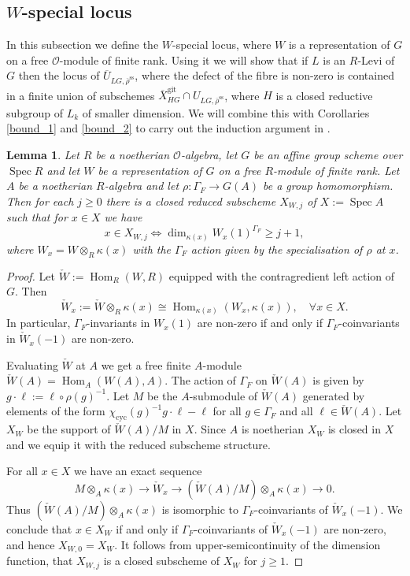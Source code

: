 \documentclass{amsart}
\newtheorem{lem}[prop]{Lemma}
\theoremstyle{definition}
\theoremstyle{remark}
\DeclareMathOperator{\Hom}{Hom}
\DeclareMathOperator{\Spec}{Spec}
\newcommand{\OO}{\mathcal O}
\newcommand{\rhobar}{\overline{\rho}}
\newcommand{\gps}{\mathrm{git}}
\newcommand{\Xbar}{\overline{X}}
\newcommand{\cyc}{\mathrm{cyc}}
\newcommand{\rhobarss}{\rhobar^{\mathrm{ss}}}
\newcommand{\Ubar}{\overline{U}}
\begin{document}
\subsection{\texorpdfstring{$W$-special locus}{W-special locus}}
In this subsection we define the $W$-special locus, where $W$ is a representation of $G$ on a 
free $\OO$-module of finite rank. Using it we will show that if $L$ is an $R$-Levi of $G$ 
then the locus of $\Ubar_{LG, \rhobarss}$, where the defect of the fibre is non-zero is contained in a finite 
union of subschemes $\Xbar^{\gps}_{HG}\cap U_{LG, \rhobarss}$, where $H$ is a closed reductive subgroup 
of $L_k$ of smaller dimension. We will combine this with Corollaries \ref{bound_1} and \ref{bound_2} 
to carry out the induction argument in .

\begin{lem}\label{V_iks} Let $R$ be a noetherian $\OO$-algebra, let $G$ be an affine group scheme 
over $\Spec R$ and let $W$ be a representation of $G$ on a free $R$-module of finite rank. 
Let $A$ be a noetherian $R$-algebra and let $\rho: \Gamma_F\rightarrow G(A)$ 
be a group homomorphism. Then for each $j\ge 0$ there is a closed reduced subscheme $X_{W, j}$ of $X:=\Spec A$ such that for 
$x\in X$ we have 
$$x\in X_{W,j}  \iff \dim_{\kappa(x)} W_x(1)^{\Gamma_F}\ge j+1,$$ where $W_x= W\otimes_{R} \kappa(x)$ with the 
$\Gamma_F$ action given by the specialisation of $\rho$ at $x$. 
\end{lem} 
\begin{proof} 
Let $\check{W}:= \Hom_R(W, R)$ equipped with the contragredient left action of  $G$. Then 
$$ \check{W}_x:= \check{W}\otimes_R \kappa(x)\cong \Hom_{\kappa(x)}(W_x, \kappa(x)), \quad \forall 
x\in X.$$
In particular, $\Gamma_F$-invariants in $W_x(1)$ are non-zero if and only if $\Gamma_F$-coinvariants 
in $\check{W}_x(-1)$ are non-zero.

Evaluating $\check{W}$ at $A$ we
get a free finite $A$-module $\check{W}(A)=\Hom_A(W(A), A)$.  
The action of $\Gamma_F$ on $\check{W}(A)$ is given by $g \cdot \ell:= \ell\circ \rho(g)^{-1}$. 
Let $M$ be the $A$-submodule of  $\check{W}(A)$ generated by elements of the form 
$ \chi_{\cyc}(g)^{-1} g \cdot \ell  - \ell$ for all $g\in \Gamma_F$ and all $\ell \in \check{W}(A)$.
Let $X_W$ be the support of $\check{W}(A)/ M$ in $X$. Since $A$ is noetherian $X_W$ is closed in $X$ 
and we equip it with the reduced subscheme structure. 

For all $x\in X$ we have an exact sequence 
$$ M\otimes_A \kappa(x) \rightarrow \check{W}_x \rightarrow (\check{W}(A)/M)\otimes_A \kappa(x)\rightarrow 0.$$
Thus $(\check{W}(A)/M)\otimes_A \kappa(x)$ is isomorphic to $\Gamma_F$-coinvariants of 
$\check{W}_x(-1)$. We conclude that $x\in X_W$ if and only if $\Gamma_F$-coinvariants of 
$\check{W}_x(-1)$ are non-zero, and hence $X_{W,0}=X_W$.  It follows from upper-semicontinuity of the dimension
function, \cite[Example III.12.7.2]{hartshorne} that $X_{W,j}$ is a closed subscheme of $X_{W}$ for $j\ge 1$.
\end{proof} 
\end{document}
